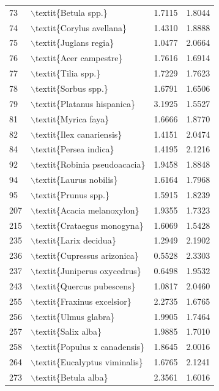 \begin{table}[ht]
\begin{tabular}{llrr}
  73 & $\backslash$textit\{Betula spp.\} & 1.7115 & 1.8044 \\ 
  74 & $\backslash$textit\{Corylus avellana\} & 1.4310 & 1.8888 \\ 
  75 & $\backslash$textit\{Juglans regia\} & 1.0477 & 2.0664 \\ 
  76 & $\backslash$textit\{Acer campestre\} & 1.7616 & 1.6914 \\ 
  77 & $\backslash$textit\{Tilia spp.\} & 1.7229 & 1.7623 \\ 
  78 & $\backslash$textit\{Sorbus spp.\} & 1.6791 & 1.6506 \\ 
  79 & $\backslash$textit\{Platanus hispanica\} & 3.1925 & 1.5527 \\ 
  81 & $\backslash$textit\{Myrica faya\} & 1.6666 & 1.8770 \\ 
  82 & $\backslash$textit\{Ilex canariensis\} & 1.4151 & 2.0474 \\ 
  84 & $\backslash$textit\{Persea indica\} & 1.4195 & 2.1216 \\ 
  92 & $\backslash$textit\{Robinia pseudoacacia\} & 1.9458 & 1.8848 \\ 
  94 & $\backslash$textit\{Laurus nobilis\} & 1.6164 & 1.7968 \\ 
  95 & $\backslash$textit\{Prunus spp.\} & 1.5915 & 1.8239 \\ 
  207 & $\backslash$textit\{Acacia melanoxylon\} & 1.9355 & 1.7323 \\ 
  215 & $\backslash$textit\{Crataegus monogyna\} & 1.6069 & 1.5428 \\ 
  235 & $\backslash$textit\{Larix decidua\} & 1.2949 & 2.1902 \\ 
  236 & $\backslash$textit\{Cupressus arizonica\} & 0.5528 & 2.3303 \\ 
  237 & $\backslash$textit\{Juniperus oxycedrus\} & 0.6498 & 1.9532 \\ 
  243 & $\backslash$textit\{Quercus pubescens\} & 1.0817 & 2.0460 \\ 
  255 & $\backslash$textit\{Fraxinus excelsior\} & 2.2735 & 1.6765 \\ 
  256 & $\backslash$textit\{Ulmus glabra\} & 1.9905 & 1.7464 \\ 
  257 & $\backslash$textit\{Salix alba\} & 1.9885 & 1.7010 \\ 
  258 & $\backslash$textit\{Populus x canadensis\} & 1.8645 & 2.0016 \\ 
  264 & $\backslash$textit\{Eucalyptus viminalis\} & 1.6765 & 2.1241 \\ 
  273 & $\backslash$textit\{Betula alba\} & 2.3561 & 1.6016 \\ 

\end{tabular}
\end{table}
